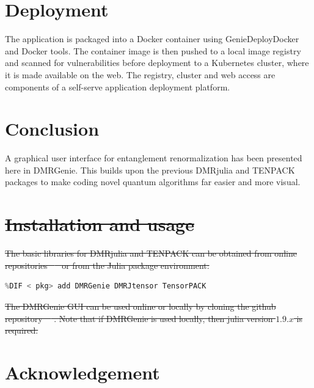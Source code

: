 \documentclass{juliacon}
\providecommand{\DIFdeltex}[1]{{\protect\color{red}\sout{#1}}}                      %
\providecommand{\DIFaddend}{} %
\providecommand{\DIFdelbegin}{} %
\providecommand{\DIFdelend}{} %
\providecommand{\DIFmodbegin}{} %
\providecommand{\DIFmodend}{} %
\providecommand{\DIFdel}[1]{\texorpdfstring{\DIFdeltex{#1}}{}} %
\begin{document}
\DIFaddend \section{Deployment}

The application is packaged into a Docker container using GenieDeployDocker and Docker tools.  The container image is then pushed to a local image registry and scanned for vulnerabilities before deployment to a Kubernetes cluster, where it is made available on the web.  The registry,  cluster and web access are components of a self-serve application deployment platform.

\section{Conclusion}

A graphical user interface for entanglement renormalization has been presented here in DMRGenie. This builds upon the previous DMRjulia and TENPACK packages to make coding novel quantum algorithms far easier and more visual. 

\DIFdelbegin \section{\DIFdel{Installation and usage}}
\addtocounter{section}{-1}%

\DIFdel{The basic libraries for DMRjulia and TENPACK can be obtained from online repositories \mbox{%
\cite{dmrjulia,tenpack} }\hskip0pt%
or from the Julia package environment:
}%
\DIFmodbegin
\begin{lstlisting}[language = Julia,alsolanguage=DIFcode]
%DIF < julia> ]
%DIF < pkg> add DMRGenie DMRJtensor TensorPACK
\end{lstlisting}
\DIFmodend %

\DIFdel{The DMRGenie GUI can be used online or locally by cloning the github repository~\mbox{%
\cite{dmrgenie}}\hskip0pt%
. Note that if DMRGenie is used locally, then julia version $1.9.x$ is required.
}%

\DIFdelend \section{Acknowledgement}
\end{document}
